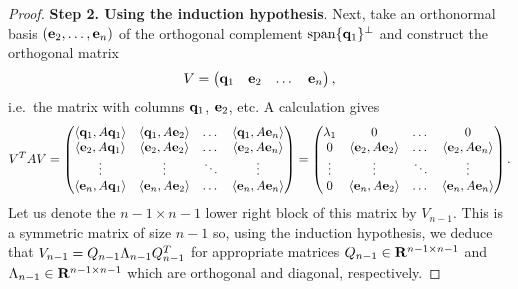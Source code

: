 \begin{proof}
            \vspace{.3cm}
            \textbf{Step 2. Using the induction hypothesis}.
            Next,
            take an orthonormal basis $(\mathbf e_2, \dotsc, \mathbf e_n)$ of the orthogonal complement $\operatorname{span}\{\mathbf q_1\}^\perp$
            and construct the orthogonal matrix
            \[
                V = \begin{pmatrix} \mathbf q_1 & \mathbf e_2 & \dots & \mathbf e_n \end{pmatrix},
            \]
            i.e.\ the matrix with columns $\mathbf q_1$, $\mathbf e_2$, etc.
            A calculation gives
            \[
                V^T A V =
                \begin{pmatrix}
                    \langle\mathbf q_1, A \mathbf q_1\rangle & \langle\mathbf q_1, A \mathbf e_2\rangle & \dots & \langle\mathbf q_1, A \mathbf e_n\rangle \\
                    \langle\mathbf e_2, A \mathbf q_1\rangle & \langle\mathbf e_2, A \mathbf e_2\rangle & \dots & \langle\mathbf e_2, A \mathbf e_n\rangle \\
                    \vdots & \vdots & \ddots & \vdots \\
                    \langle\mathbf e_n, A \mathbf q_1\rangle & \langle\mathbf e_n, A \mathbf e_2\rangle & \dots & \langle\mathbf e_n, A \mathbf e_n\rangle
                \end{pmatrix}
                =
                \begin{pmatrix}
                    \lambda_1 & 0 & \dots & 0 \\
                    0 & \langle\mathbf e_2, A \mathbf e_2\rangle & \dots & \langle\mathbf e_2, A \mathbf e_n\rangle \\
                    \vdots & \vdots & \ddots & \vdots \\
                    0 & \langle\mathbf e_n, A \mathbf e_2\rangle & \dots & \langle\mathbf e_n, A \mathbf e_n\rangle
                \end{pmatrix}.
            \]
            Let us denote the $n-1 \times n-1$ lower right block of this matrix by $V_{n-1}$.
            This is a symmetric matrix of size $n-1$ so,
            using the induction hypothesis,
            we deduce that $V_{n-1} = Q_{n-1} \Lambda_{n-1} Q_{n-1}^T$
            for appropriate matrices $Q_{n-1} \in \mathbf R^{n-1 \times n-1}$ and $\Lambda_{n-1} \in \mathbf R^{n-1 \times n-1}$
            which are orthogonal and diagonal, respectively.


\end{proof}
